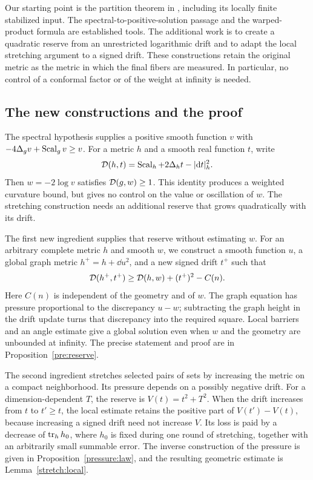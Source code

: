 Our starting point is the partition theorem in
\cite{OpenAIWidth}, including its locally finite stabilized input.
The spectral-to-positive-solution passage and the warped-product
formula are established tools. The additional work is to create a
quadratic reserve from an unrestricted logarithmic drift and to adapt
the local stretching argument to a signed drift. These constructions
retain the original metric as the metric in which the final fibers
are measured. In particular, no control of a conformal factor or of
the weight at infinity is needed.

\subsection{The new constructions and the proof}

The spectral hypothesis supplies a positive smooth function $v$ with
$-4\Delta_g v+\operatorname{Scal}_gv\ge v$. For a metric $h$ and a smooth real
function $t$, write
\begin{equation}\label{eq:drift-scalar}
 \mathcal D(h,t)=\operatorname{Scal}_h+2\Delta_h t-|\mathrm d t|_h^2.
\end{equation}
Then $w=-2\log v$ satisfies $\mathcal D(g,w)\ge1$.
This identity produces a weighted curvature bound, but gives no
control on the value or oscillation of $w$. The stretching construction
needs an additional reserve that grows quadratically with its drift.

The first new ingredient supplies that reserve without estimating $w$.
For an arbitrary complete metric $h$ and smooth $w$, we construct a
smooth function $u$, a global graph metric $h^+=h+\dd u^2$, and a new signed drift $t^+$ such
that
\[
 \mathcal D(h^+,t^+)\ge\mathcal D(h,w)+(t^+)^2-C(n).
\]
Here $C(n)$ is independent of the geometry and of $w$. The graph
equation has pressure proportional to the discrepancy $u-w$; subtracting
the graph height in the drift update turns that discrepancy into the
required square. Local barriers and an angle estimate give a global
solution even when $w$ and the geometry are unbounded at infinity.
The precise statement and proof are in Proposition~\ref{pre:reserve}.

The second ingredient stretches selected pairs of sets by increasing
the metric on a compact neighborhood. Its pressure depends on a
possibly negative drift. For a dimension-dependent $T$, the reserve
is $V(t)=t^2+T^2$. When the drift increases from $t$ to $t'\ge t$,
the local estimate retains the positive part of
$V(t')-V(t)$, because increasing a signed drift need not increase
$V$. Its loss is paid by a decrease of $\operatorname{tr}_h h_0$, where $h_0$ is
fixed during one round of stretching, together with an arbitrarily
small summable error. The inverse construction of the pressure is
given in Proposition~\ref{pressure:law}, and the resulting geometric estimate
is Lemma~\ref{stretch:local}.

